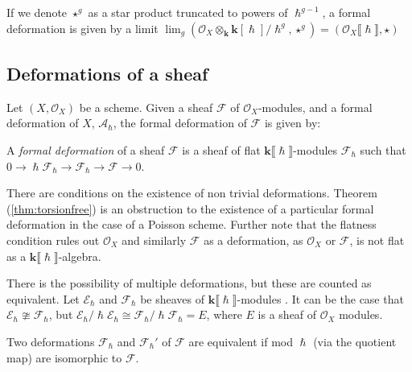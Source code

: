     If we denote \( \star^{g}\) as a star product truncated to powers of \(\hslash^{g-1}\), a formal deformation is given by a limit 
    \( \lim_g (\mathcal{O}_X \otimes_{\mathbf{k}} \mathbf{k}[\hslash]/\hslash^g, \star^g) = (\mathcal{O}_X \lBrack \hslash \rBrack, \star ) \)
    
    

    \subsection{Deformations of a sheaf} 
    
    Let \((X,\mathcal{O}_X)\) be a scheme. Given a sheaf \( \mathcal{F}\) of \( \mathcal{O}_X\)-modules, and a formal deformation of \(X\), \( \mathcal{A}_{\hslash}\), the formal deformation of \( \mathcal{F}\) is given by:
    \begin{defn}
    A \emph{formal deformation} of a sheaf \( \mathcal{F}\) is a sheaf of flat \(\mathbf{k}\lBrack\hslash\rBrack \)-modules \( \mathcal{F}_{\hslash}\) such that
    \( 0 \rightarrow \hslash \mathcal{F}_{\hslash} \rightarrow  \mathcal{F}_{\hslash} \rightarrow \mathcal{F}  \rightarrow 0 \).
    \end{defn}
    
    There are conditions on the existence of non trivial deformations. Theorem (\ref{thm:torsionfree}) is an obstruction to the existence of a particular formal deformation in the case of a Poisson scheme. Further note that the flatness condition rules out \( \mathcal{O}_X\) and similarly \( \mathcal{F}\) as a deformation, as \( \mathcal{O}_X\) or \( \mathcal{F}\), is not flat as a \( \mathbf{k}\lBrack \hslash\rBrack\)-algebra.

    There is the possibility of multiple deformations, but these are counted as equivalent. Let \( \mathcal{E}_\hslash \) and \( \mathcal{F}_\hslash\) be sheaves of  \(  \mathbf{k}\lBrack\hslash\rBrack\)-modules . It can be the case that \( \mathcal{E}_\hslash \ncong \mathcal{F}_\hslash\), but \( \mathcal{E}_\hslash/ \hslash \mathcal{E}_{\hslash} \cong \mathcal{F}_\hslash/ \hslash \mathcal{F}_{\hslash} = E\), where \( E \) is a sheaf of \( \mathcal{O}_X\) modules.

    \begin{defn}
    Two deformations \( \mathcal{F}_{\hslash}\) and \( \mathcal{F}_{\hslash}'\) of \(\mathcal{F}\) are equivalent if mod \( \hslash\) (via the quotient map) are isomorphic to \( \mathcal{F}\).
    \end{defn}

